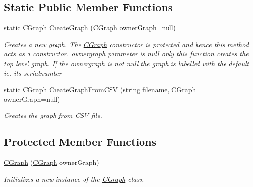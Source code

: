 \subsection*{Static Public Member Functions}
\begin{DoxyCompactItemize}
\item 
static \hyperlink{class_graph_library_1_1_c_graph}{C\+Graph} \hyperlink{class_graph_library_1_1_c_graph_af4914521623ddb668b21285684e6e6fc}{Create\+Graph} (\hyperlink{class_graph_library_1_1_c_graph}{C\+Graph} owner\+Graph=null)
\begin{DoxyCompactList}\small\item\em Creates a new graph. The \hyperlink{class_graph_library_1_1_c_graph}{C\+Graph} constructor is protected and hence this method acts as a constructor. ownergraph parameter is null only this function creates the top level graph. If the ownergraph is not null the graph is labelled with the default ie. its serialnumber \end{DoxyCompactList}\item 
static \hyperlink{class_graph_library_1_1_c_graph}{C\+Graph} \hyperlink{class_graph_library_1_1_c_graph_a4e157e57dd1a6c927935c27d3e16fd00}{Create\+Graph\+From\+C\+S\+V} (string filename, \hyperlink{class_graph_library_1_1_c_graph}{C\+Graph} owner\+Graph=null)
\begin{DoxyCompactList}\small\item\em Creates the graph from C\+S\+V file. \end{DoxyCompactList}\end{DoxyCompactItemize}
\subsection*{Protected Member Functions}
\begin{DoxyCompactItemize}
\item 
\hyperlink{class_graph_library_1_1_c_graph_a62d8da6f4b059adea3ef77ea8e014569}{C\+Graph} (\hyperlink{class_graph_library_1_1_c_graph}{C\+Graph} owner\+Graph)
\begin{DoxyCompactList}\small\item\em Initializes a new instance of the \hyperlink{class_graph_library_1_1_c_graph}{C\+Graph} class. \end{DoxyCompactList}\end{DoxyCompactItemize}

